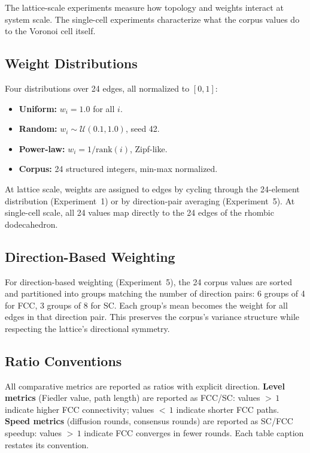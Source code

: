 \documentclass[11pt]{article}
\begin{document}
The lattice-scale experiments measure how topology and weights
interact at system scale. The single-cell experiments characterize
what the corpus values do to the Voronoi cell itself.

\subsection{Weight Distributions}

Four distributions over 24 edges, all normalized to $[0,1]$:

\begin{itemize}
  \item \textbf{Uniform:} $w_i = 1.0$ for all $i$.
  \item \textbf{Random:} $w_i \sim \mathcal{U}(0.1, 1.0)$, seed 42.
  \item \textbf{Power-law:} $w_i = 1/\text{rank}(i)$, Zipf-like.
  \item \textbf{Corpus:} 24 structured integers, min-max normalized.
\end{itemize}

At lattice scale, weights are assigned to edges by cycling through
the 24-element distribution (Experiment~1) or by direction-pair
averaging (Experiment~5). At single-cell scale, all 24 values map
directly to the 24 edges of the rhombic dodecahedron.

\subsection{Direction-Based Weighting}

For direction-based weighting (Experiment~5), the 24 corpus values
are sorted and partitioned into groups matching the number of
direction pairs: 6 groups of 4 for FCC, 3 groups of 8 for SC.
Each group's mean becomes the weight for all edges in that
direction pair. This preserves the corpus's variance structure
while respecting the lattice's directional symmetry.

\subsection{Ratio Conventions}

All comparative metrics are reported as ratios with explicit direction.
\textbf{Level metrics} (Fiedler value, path length) are reported as
FCC/SC: values ${>}\,1$ indicate higher FCC connectivity; values
${<}\,1$ indicate shorter FCC paths. \textbf{Speed metrics} (diffusion
rounds, consensus rounds) are reported as SC/FCC speedup: values
${>}\,1$ indicate FCC converges in fewer rounds. Each table caption
restates its convention.
\end{document}
